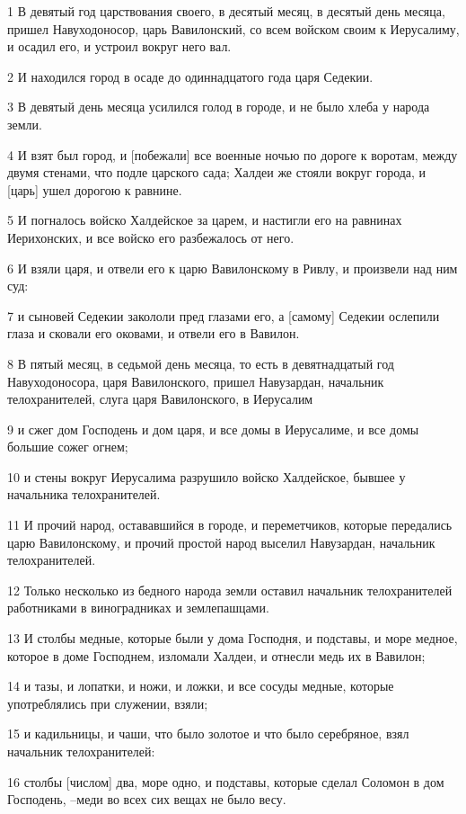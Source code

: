 \par 1 В девятый год царствования своего, в десятый месяц, в десятый день месяца, пришел Навуходоносор, царь Вавилонский, со всем войском своим к Иерусалиму, и осадил его, и устроил вокруг него вал.
\par 2 И находился город в осаде до одиннадцатого года царя Седекии.
\par 3 В девятый день месяца усилился голод в городе, и не было хлеба у народа земли.
\par 4 И взят был город, и [побежали] все военные ночью по дороге к воротам, между двумя стенами, что подле царского сада; Халдеи же стояли вокруг города, и [царь] ушел дорогою к равнине.
\par 5 И погналось войско Халдейское за царем, и настигли его на равнинах Иерихонских, и все войско его разбежалось от него.
\par 6 И взяли царя, и отвели его к царю Вавилонскому в Ривлу, и произвели над ним суд:
\par 7 и сыновей Седекии закололи пред глазами его, а [самому] Седекии ослепили глаза и сковали его оковами, и отвели его в Вавилон.
\par 8 В пятый месяц, в седьмой день месяца, то есть в девятнадцатый год Навуходоносора, царя Вавилонского, пришел Навузардан, начальник телохранителей, слуга царя Вавилонского, в Иерусалим
\par 9 и сжег дом Господень и дом царя, и все домы в Иерусалиме, и все домы большие сожег огнем;
\par 10 и стены вокруг Иерусалима разрушило войско Халдейское, бывшее у начальника телохранителей.
\par 11 И прочий народ, остававшийся в городе, и переметчиков, которые передались царю Вавилонскому, и прочий простой народ выселил Навузардан, начальник телохранителей.
\par 12 Только несколько из бедного народа земли оставил начальник телохранителей работниками в виноградниках и землепашцами.
\par 13 И столбы медные, которые были у дома Господня, и подставы, и море медное, которое в доме Господнем, изломали Халдеи, и отнесли медь их в Вавилон;
\par 14 и тазы, и лопатки, и ножи, и ложки, и все сосуды медные, которые употреблялись при служении, взяли;
\par 15 и кадильницы, и чаши, что было золотое и что было серебряное, взял начальник телохранителей:
\par 16 столбы [числом] два, море одно, и подставы, которые сделал Соломон в дом Господень, --меди во всех сих вещах не было весу.

